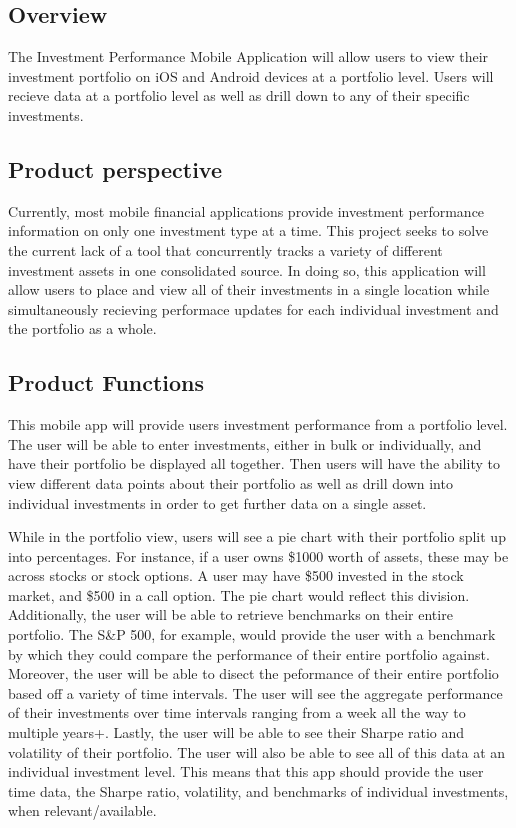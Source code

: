 \documentclass[onecolumn, draftclsnofoot,10pt, compsoc]{IEEEtran}
\begin{document}
\subsection{Overview}

The Investment Performance Mobile Application will allow users to view their investment portfolio on iOS and Android devices
at a portfolio level. Users will recieve data at a portfolio level as well as drill down to any of their specific investments.


\subsection{Product perspective}

Currently, most mobile financial applications provide investment performance information on only one investment type at a time. 
This project seeks to solve the current lack of a tool that concurrently tracks a variety of different investment assets in 
one consolidated source. In doing so, this application will allow users to place and view all of their investments in a single location 
while simultaneously recieving performace updates for each individual investment and the portfolio as a whole.

\subsection{Product Functions}
This mobile app will provide users investment performance from a portfolio level. The user will be able to enter investments, either 
in bulk or individually, and have their portfolio be displayed all together. Then users will have the ability to view different data
points about their portfolio as well as drill down into individual investments in order to get further data on a single asset.

While in the portfolio view, users will see a pie chart with their portfolio split up into percentages. 
For instance, if a user owns \$1000 worth of assets, these may be across stocks or stock options. A user may have \$500 invested in the stock market, 
and \$500 in a call option. The pie chart would reflect this division. Additionally, the user will be able to retrieve benchmarks on their entire portfolio. 
The S\&P 500, for example, would provide the user with a benchmark by which they could compare the performance of their entire portfolio against. 
Moreover, the user will be able to disect the peformance of their entire portfolio based off a variety of time intervals. The user will see the aggregate 
performance of their investments over time intervals ranging from a week all the way to multiple years+. Lastly, the user will be able to see their Sharpe ratio and volatility of their portfolio. 
The user will also be able to see all of this data at an individual investment level. This means that this app should provide the user 
time data, the Sharpe ratio, volatility, and benchmarks of individual investments, when relevant/available.
\end{document}
